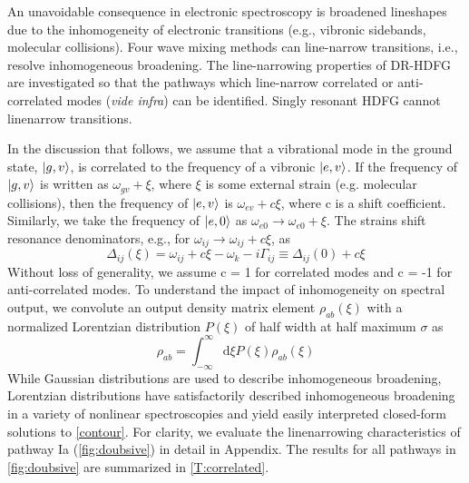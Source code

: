 \documentclass[aip, jcp, reprint, onecolumn]{revtex4-2}
\begin{document}

An unavoidable consequence in electronic spectroscopy is broadened lineshapes due to the inhomogeneity of electronic transitions (e.g., vibronic sidebands, molecular collisions). 
Four wave mixing methods can line-narrow transitions, i.e., resolve inhomogeneous broadening.\cite{Carlson1990line}
The line-narrowing properties of DR-HDFG are investigated so that the pathways which line-narrow correlated or anti-correlated modes (\textit{vide infra}) can be identified.
Singly resonant HDFG cannot linenarrow transitions. \cite{RN352}

In the discussion that follows, we assume that a vibrational mode in the ground state, $\ket{g,v}$, is correlated to the frequency of a vibronic $\ket{e,v}$.\cite{Carlson1990}
If the frequency of $\ket{g,v}$ is written as $\omega_{gv} + \xi$, where $\xi$ is some external strain (e.g. molecular collisions), then the frequency of $\ket{e,v}$ is $\omega_{ev} + c\xi$, where c is a shift coefficient.
Similarly, we take the frequency of $\ket{e,0}$ as $\omega_{e0} \rightarrow \omega_{e0} + \xi$.
The strains shift resonance denominators, e.g., for $\omega_{ij} \rightarrow \omega_{ij} + c\xi$, as
\begin{equation}
	\Delta_{ij}(\xi) = \omega_{ij} + c\xi -\omega_k - i\Gamma_{ij} \equiv \Delta_{ij}(0) + c\xi
\end{equation}
Without loss of generality, we assume c = 1 for correlated modes and c = -1 for anti-correlated modes.
To understand the impact of inhomogeneity on spectral output, we convolute an output density matrix element $\rho_{ab}(\xi)$ with a normalized Lorentzian distribution $P(\xi)$ of half width at half maximum $\sigma$ as
\begin{equation}\label{contour}
	\rho_{ab} = \int_{-\infty}^\infty \mathrm{d}\xi P(\xi) \rho_{ab}(\xi)
\end{equation} 
While Gaussian distributions are used to describe inhomogeneous broadening,\cite{druet1979line, RN307, Ouellette1982} Lorentzian distributions have satisfactorily described inhomogeneous broadening in a variety of nonlinear spectroscopies and yield easily interpreted closed-form solutions to \autoref{contour}. \cite{Penner1976, Desiderio1979, Dick83_1, Carlson1990line}
For clarity, we evaluate the linenarrowing characteristics of pathway Ia (\autoref{fig:doubsive}) in detail in Appendix.
The results for all pathways in \autoref{fig:doubsive} are summarized in \autoref{T:correlated}.
\end{document}
